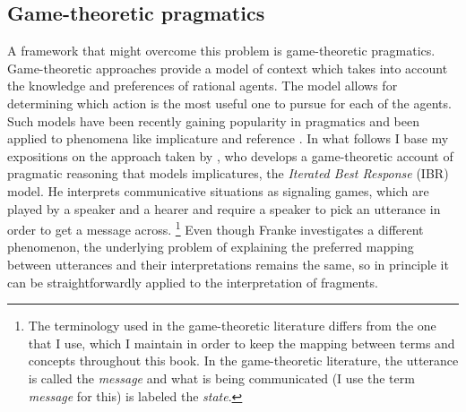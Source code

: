 \subsection{Game-theoretic pragmatics}
A framework that might overcome this problem is game-theoretic pragmatics. Game-theoretic approaches provide a model of context which takes into account the knowledge and preferences of rational agents. The model allows for determining which action is the most useful one to pursue for each of the agents. Such models have been recently gaining popularity in pragmatics and been applied to phenomena like implicature \citep{vanrooy2004, benz.vanrooij2007, franke2009, jager2012, goodman.stuhlmuller2013, gotzner.benz2018} and reference \citep{frank.goodman2012, rohde.etal2012, sikos.etal2019}. In what follows I base my expositions on the approach taken by \citet{franke2009}, who develops a game-theoretic account of pragmatic reasoning that models implicatures, the \textit{Iterated Best Response} (IBR) model. He interprets communicative situations as signaling games, which are played by a speaker and a hearer and require a speaker to pick an utterance in order to get a message across.%
%
\footnote{The terminology used in the game-theoretic literature differs from the one that I use, which I maintain in order to keep the mapping between terms and concepts throughout this book. In the game-theoretic literature, the utterance is called the \textit{message} and what is being communicated (I use the term \emph{message} for this) is labeled the \textit{state}.}\afterfn%
%
Even though Franke investigates a different phenomenon, the underlying problem of explaining the preferred mapping between utterances and their interpretations remains the same, so in principle it can be straightforwardly applied to the interpretation of fragments.

